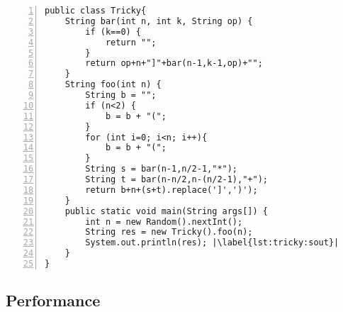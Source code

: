 \begin{lstlisting}[float, escapechar=|, numbers=left, caption=Tricky example, label=lst:tricky, captionpos=b, basicstyle=\small]
public class Tricky{
	String bar(int n, int k, String op) {
		if (k==0) {
			return "";
		}
		return op+n+"]"+bar(n-1,k-1,op)+"";
	}
	String foo(int n) {
		String b = "";
		if (n<2) {
			b = b + "(";
		}
		for (int i=0; i<n; i++){
			b = b + "(";
		}
		String s = bar(n-1,n/2-1,"*");
		String t = bar(n-n/2,n-(n/2-1),"+");
		return b+n+(s+t).replace(']',')');
	}
	public static void main(String args[]) {
		int n = new Random().nextInt();
		String res = new Tricky().foo(n);
		System.out.println(res); |\label{lst:tricky:sout}|
	}
}
\end{lstlisting}

\subsection{Performance}

\begin{comment}
\begin{itemize}
\item How did you test/evaluate your PoC?
    \begin{itemize}
    \item E.g. case studies, large-scale studies, test bench, etc.
    \item What did you do to verify results (if applicable)
    \end{itemize}
\item What did you learn from these tests? Depends on your work. E.g.
    \begin{itemize}
    \item TP/TN/FP/FN rates
    \item Performance
    \item Results of your studies
    \item Interpretation of the results, lessons learned
    \end{itemize}
\item Limitations of the approach and your implementation. Any ideas on how to fix them?
\end{itemize}

Probably 5-15 pages
\end{comment}